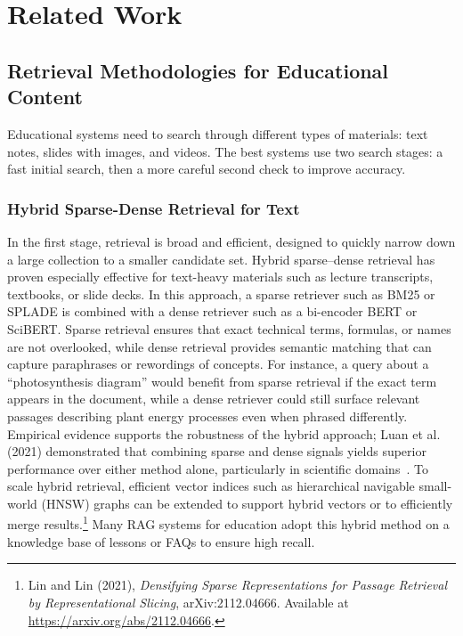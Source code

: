 \chapter{Related Work}

\section{Retrieval Methodologies for Educational Content}
\label{sec:retrieval-methodologies}

Educational systems need to search through different types of materials: text notes, slides with images, and videos. The best systems use two search stages: a fast initial search, then a more careful second check to improve accuracy.

\subsection{Hybrid Sparse-Dense Retrieval for Text}
\label{subsec:hybrid-retrieval}

In the first stage, retrieval is broad and efficient, designed to quickly narrow down a large collection to a smaller candidate set. Hybrid sparse–dense retrieval has proven especially effective for text-heavy materials such as lecture transcripts, textbooks, or slide decks. In this approach, a sparse retriever such as BM25 or SPLADE is combined with a dense retriever such as a bi-encoder BERT or SciBERT. Sparse retrieval ensures that exact technical terms, formulas, or names are not overlooked, while dense retrieval provides semantic matching that can capture paraphrases or rewordings of concepts. For instance, a query about a ``photosynthesis diagram'' would benefit from sparse retrieval if the exact term appears in the document, while a dense retriever could still surface relevant passages describing plant energy processes even when phrased differently. Empirical evidence supports the robustness of the hybrid approach; Luan et al. (2021) demonstrated that combining sparse and dense signals yields superior performance over either method alone, particularly in scientific domains~\cite{luan2021sparse_dense}. To scale hybrid retrieval, efficient vector indices such as hierarchical navigable small-world (HNSW) graphs can be extended to support hybrid vectors or to efficiently merge results.\footnote{Lin and Lin (2021), \emph{Densifying Sparse Representations for Passage Retrieval by Representational Slicing}, arXiv:2112.04666. Available at \url{https://arxiv.org/abs/2112.04666}.} Many RAG systems for education adopt this hybrid method on a knowledge base of lessons or FAQs to ensure high recall.

